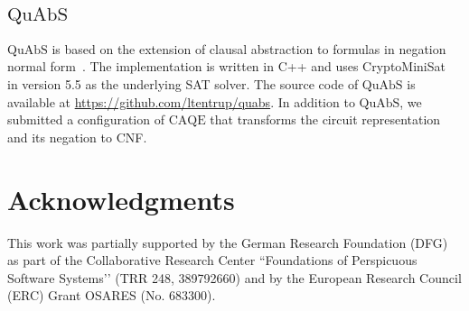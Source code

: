 \documentclass[11pt,twocolumn]{article}
\newcommand{\caqe}{\text{CAQE}}
\newcommand{\quabs}{\text{QuAbS}}
\begin{document}
\subsection{$\quabs$}

$\quabs$ is based on the extension of clausal abstraction to formulas in negation normal form~\cite{journals/corr/Tentrup16,conf/sat/Tentrup16}.
The implementation is written in C++ and uses CryptoMiniSat~\cite{conf/sat/SoosNC09} in version 5.5 as the underlying SAT solver.
The source code of $\quabs$ is available at \url{https://github.com/ltentrup/quabs}.
In addition to $\quabs$, we submitted a configuration of $\caqe$ that transforms the circuit representation and its negation to CNF.


\section{Acknowledgments}

This work was partially supported by the German Research Foundation (DFG) as part of the Collaborative Research Center ``Foundations of Perspicuous Software Systems’' (TRR 248, 389792660) and by the European Research Council (ERC) Grant OSARES (No. 683300).




\end{document}
